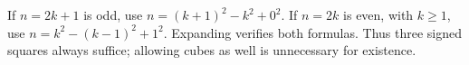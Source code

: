 If $n=2k+1$ is odd, use $n=(k+1)^2-k^2+0^2$. If $n=2k$ is even, with $k\ge1$, use $n=k^2-(k-1)^2+1^2$. Expanding verifies both formulas. Thus three signed squares always suffice; allowing cubes as well is unnecessary for existence.
